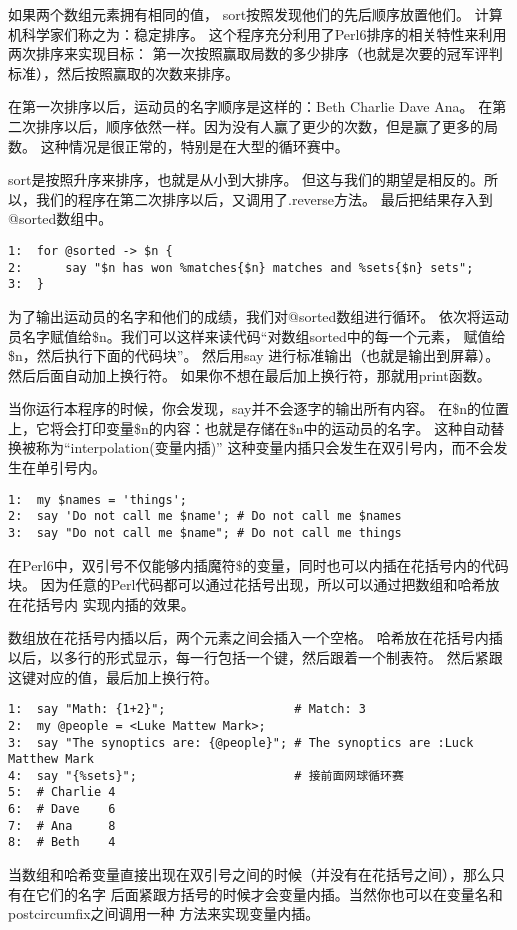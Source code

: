 \documentclass[11pt]{ctexart}
\begin{document}
如果两个数组元素拥有相同的值， sort按照发现他们的先后顺序放置他们。
计算机科学家们称之为：稳定排序。
这个程序充分利用了Perl6排序的相关特性来利用两次排序来实现目标：
第一次按照赢取局数的多少排序（也就是次要的冠军评判标准），然后按照赢取的次数来排序。

在第一次排序以后，运动员的名字顺序是这样的：Beth Charlie Dave Ana。
在第二次排序以后，顺序依然一样。因为没有人赢了更少的次数，但是赢了更多的局数。
这种情况是很正常的，特别是在大型的循环赛中。

sort是按照升序来排序，也就是从小到大排序。
但这与我们的期望是相反的。所以，我们的程序在第二次排序以后，又调用了.reverse方法。
最后把结果存入到@sorted数组中。


\begin{verbatim}
1:  for @sorted -> $n {
2:      say "$n has won %matches{$n} matches and %sets{$n} sets";
3:  }
\end{verbatim}

为了输出运动员的名字和他们的成绩，我们对@sorted数组进行循环。
依次将运动员名字赋值给\$n。我们可以这样来读代码“对数组sorted中的每一个元素，
赋值给\$n，然后执行下面的代码块”。
然后用say 进行标准输出（也就是输出到屏幕）。
然后后面自动加上换行符。
如果你不想在最后加上换行符，那就用print函数。

当你运行本程序的时候，你会发现，say并不会逐字的输出所有内容。
在\$n的位置上，它将会打印变量\$n的内容：也就是存储在\$n中的运动员的名字。
这种自动替换被称为“interpolation(变量内插)”
这种变量内插只会发生在双引号内，而不会发生在单引号内。

\begin{verbatim}
1:  my $names = 'things';
2:  say 'Do not call me $name'; # Do not call me $names
3:  say "Do not call me $name"; # Do not call me things
\end{verbatim}
在Perl6中，双引号不仅能够内插魔符\$的变量，同时也可以内插在花括号内的代码块。
因为任意的Perl代码都可以通过花括号出现，所以可以通过把数组和哈希放在花括号内
实现内插的效果。

数组放在花括号内插以后，两个元素之间会插入一个空格。
哈希放在花括号内插以后，以多行的形式显示，每一行包括一个键，然后跟着一个制表符。
然后紧跟这键对应的值，最后加上换行符。

\begin{verbatim}
1:  say "Math: {1+2}";                  # Match: 3
2:  my @people = <Luke Mattew Mark>;
3:  say "The synoptics are: {@people}"; # The synoptics are :Luck Matthew Mark
4:  say "{%sets}";                      # 接前面网球循环赛
5:  # Charlie 4
6:  # Dave    6
7:  # Ana     8
8:  # Beth    4
\end{verbatim}
当数组和哈希变量直接出现在双引号之间的时候（并没有在花括号之间），那么只有在它们的名字
后面紧跟方括号的时候才会变量内插。当然你也可以在变量名和postcircumfix之间调用一种
方法来实现变量内插。
\end{document}
